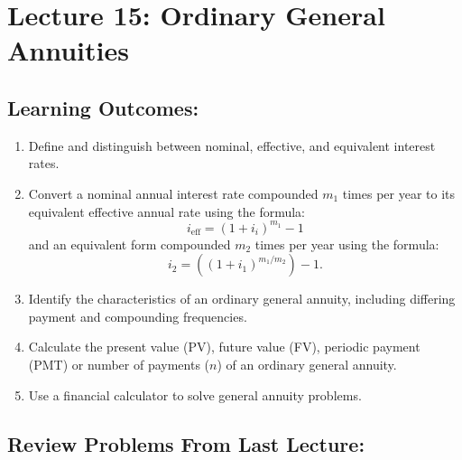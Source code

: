 \documentclass[
]{book}
\providecommand{\tightlist}{%
  \setlength{\itemsep}{0pt}\setlength{\parskip}{0pt}}
\begin{document}
\section*{Lecture 15: Ordinary General Annuities}\label{lecture-15-ordinary-general-annuities}

\subsection*{Learning Outcomes:}\label{learning-outcomes-14}

\begin{enumerate}
\def\labelenumi{\arabic{enumi}.}
\tightlist
\item
  Define and distinguish between nominal, effective, and equivalent interest rates.
\item
  Convert a nominal annual interest rate compounded \(m_1\) times per year to its equivalent effective annual rate using the formula:
  \[
   i_{\text{eff}} = \left(1 +i_i\right)^{m_1} - 1
   \]
  and an equivalent form compounded \(m_2\) times per year using the formula:
  \[
   i_2 =  \left( (1 + i_{1})^{m_1/m_2} \right) - 1 .
   \]
\item
  Identify the characteristics of an ordinary general annuity, including differing payment and compounding frequencies.
\item
  Calculate the present value (PV), future value (FV), periodic payment (PMT) or number of payments (\(n\)) of an ordinary general annuity.
\item
  Use a financial calculator to solve general annuity problems.
\end{enumerate}

\subsection*{Review Problems From Last Lecture:}\label{review-problems-from-last-lecture-13}
\end{document}
